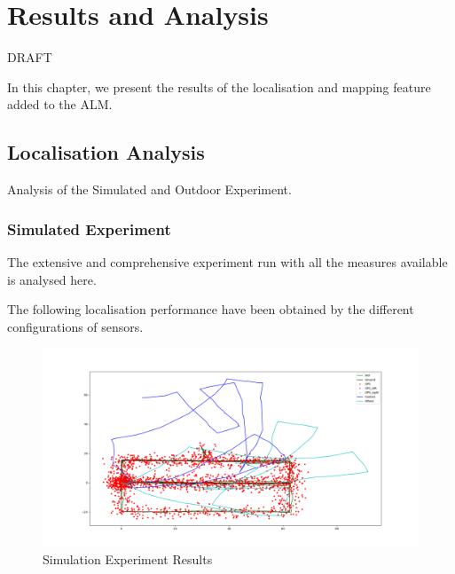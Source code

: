\chapter{Results and Analysis}
\label{ch:resultsAndAnalysis}

DRAFT

\noindent
In this chapter, we present the results of the localisation and mapping feature added to the \gls{ALM}.


\section{Localisation Analysis}

\noindent Analysis of the Simulated and Outdoor Experiment.

\subsection{Simulated Experiment }
\noindent The extensive and comprehensive experiment run with all the measures available is analysed here.

The following localisation performance have been obtained by the different configurations of sensors.

\begin{figure}[!ht]
	\begin{center}
		\includegraphics[width=1\textwidth]{Images/5-Results/Sim-Control-WO-GPSs-IMUs.png}
	\end{center}
	\caption{Simulation Experiment Results}
	\label{fig:simRes}
\end{figure}

